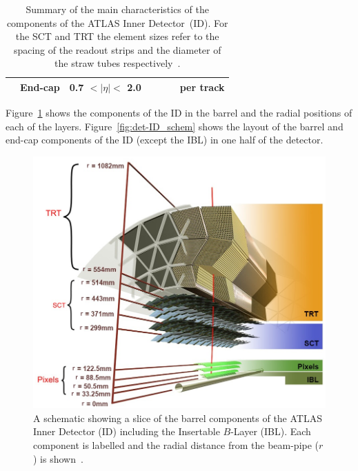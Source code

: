 {\begin{table}[!htb]
\begin{tabular}{|cc||c|c|rr|c|}
                         & End-cap   &         0.7  $\lt |\eta| \lt$  2.0    &                  &                         &                  & per track        \\ %
  \hline
\end{tabular}
\caption[Summary of the main characteristics of the components of the ATLAS Inner Detector.]
        {\label{tab:det-ID}Summary of the main characteristics of the components of the ATLAS Inner Detector~(ID).
          For the SCT and TRT the element sizes refer to the spacing of the readout strips and the diameter of the straw tubes respectively~\cite{det-ATLAS_Exp,det-ID_table}.}
         \vspace{-1em}
\end{table}
}

Figure~\ref{fig:det-ID_slice} shows the components of the ID in the barrel and the radial positions of each of the layers.
Figure~\ref{fig:det-ID_schem} shows the layout of the barrel and end-cap components of the ID (except the IBL) in one half of the detector.

\begin{figure}[!htb]
  \begin{center}
    \includegraphics[width=0.7\linewidth, angle=0]{figs/Detector/ID_slice.png}
  \end{center}
  \caption[A schematic showing a slice of the barrel components of the ATLAS Inner Detector including the Insertable $B$-Layer.]
          {A schematic showing a slice of the barrel components of the ATLAS Inner Detector (ID) including the Insertable $B$-Layer (IBL).
            Each component is labelled and the radial distance from the beam-pipe ($r$) is shown~\cite{obj-tracks_TIDE}.}
  \label{fig:det-ID_slice}
\end{figure}

